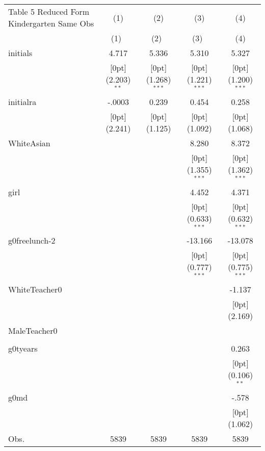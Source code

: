 \documentclass[a4paper,11pt]{article}
\begin{document}
\begin{table}
	\small
\begin{tabular*}{\textwidth}{@{\extracolsep{\fill}}lcccc}				
	Table 5 Reduced Form Kindergarten Same Obs & \multicolumn{1}{c}{(1)} &	\multicolumn{1}{c}{(2)} &	\multicolumn{1}{c}{(3)} &	\multicolumn{1}{c}{(4)} \\
	\cline{2-5}				
	& \multicolumn{1}{c}{(1)\mbox{\ }} &	\multicolumn{1}{c}{(2)\mbox{\ }} &	\multicolumn{1}{c}{(3)\mbox{\ }} &	\multicolumn{1}{c}{(4)} \\
	\hline				
	initials &	4.717 &	5.336 &	5.310 &	5.327 \\
	&	\raisebox{.7ex}[0pt]{\scriptsize (2.203)$^{**}$} &	\raisebox{.7ex}[0pt]{\scriptsize (1.268)$^{***}$} &	\raisebox{.7ex}[0pt]{\scriptsize (1.221)$^{***}$} &	\raisebox{.7ex}[0pt]{\scriptsize (1.200)$^{***}$} \\
	initialra &	-.0003 &	0.239 &	0.454 &	0.258 \\
	&	\raisebox{.7ex}[0pt]{\scriptsize (2.241)} &	\raisebox{.7ex}[0pt]{\scriptsize (1.125)} &	\raisebox{.7ex}[0pt]{\scriptsize (1.092)} &	\raisebox{.7ex}[0pt]{\scriptsize (1.068)} \\
	WhiteAsian &	&	&	8.280 &	8.372 \\
	&	&	&	\raisebox{.7ex}[0pt]{\scriptsize (1.355)$^{***}$} &	\raisebox{.7ex}[0pt]{\scriptsize (1.362)$^{***}$} \\
	girl &	&	&	4.452 &	4.371 \\
	&	&	&	\raisebox{.7ex}[0pt]{\scriptsize (0.633)$^{***}$} &	\raisebox{.7ex}[0pt]{\scriptsize (0.632)$^{***}$} \\
	g0freelunch-2 &	&	&	-13.166 &	-13.078 \\
	&	&	&	\raisebox{.7ex}[0pt]{\scriptsize (0.777)$^{***}$} &	\raisebox{.7ex}[0pt]{\scriptsize (0.775)$^{***}$} \\
	WhiteTeacher0 &	&	&	&	-1.137 \\
	&	&	&	&	\raisebox{.7ex}[0pt]{\scriptsize (2.169)} \\
	MaleTeacher0 &	&	&	&	\\
	&	&	&	&	\\
	g0tyears &	&	&	&	0.263 \\
	&	&	&	&	\raisebox{.7ex}[0pt]{\scriptsize (0.106)$^{**}$} \\
	g0md &	&	&	&	-.578 \\
	&	&	&	&	\raisebox{.7ex}[0pt]{\scriptsize (1.062)} \\
	Obs. &	5839 &	5839 &	5839 &	5839 \\
	\hline\hline				
\end{tabular*}			
\end{table}	
\end{document}
